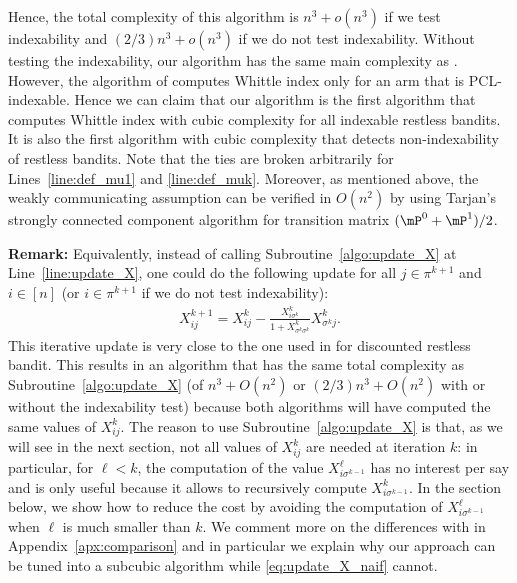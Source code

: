 Hence, the total complexity of this algorithm is $n^3+o(n^3)$ if we test indexability and $(2/3)n^3+o(n^3)$ if we do not test indexability. Without testing the indexability, our algorithm has the same main complexity as \cite{nino2020fast}. However, the algorithm of \cite{nino2020fast} computes Whittle index only for an arm that is PCL-indexable. Hence we can claim that our algorithm is the first algorithm that computes Whittle index with cubic complexity for all indexable restless bandits. It is also the first algorithm with cubic complexity that detects non-indexability of restless bandits.
Note that the ties are broken arbitrarily for Lines~\ref{line:def_mu1} and \ref{line:def_muk}. Moreover, as mentioned above, the weakly communicating assumption can be verified in $O(n^2)$ by using Tarjan's strongly connected component algorithm for transition matrix $(\mP^0+\mP^1)/2$.


\textbf{Remark:} Equivalently, instead of calling Subroutine~\ref{algo:update_X} at Line~\ref{line:update_X}, one could do the following update for all $j\in\pi^{k+1}$ and $i\in[n]$ (or $i\in\pi^{k+1}$ if we do not test indexability):
\begin{align}
    X_{ij}^{k+1} = X_{ij}^{k} -\displaystyle\frac{X^{k}_{i\sigma^{k}}}{1+X^{k}_{\sigma^{k}\sigma^{k}}}X^{k}_{\sigma^{k}j}. \label{eq:update_X_naif}
\end{align}
This iterative update is very close to the one used in \cite{akbarzadeh2020conditions,nino2020fast} for discounted restless bandit. This results in an algorithm that has the same total complexity as Subroutine~\ref{algo:update_X} (of $n^3+O(n^2)$ or $(2/3)n^3+O(n^2)$ with or without the indexability test) because both algorithms will have computed the same values of $X^{k}_{ij}$. The reason to use Subroutine~\ref{algo:update_X} is that, as we will see in the next section, not all values of $X^{k}_{ij}$ are needed at iteration $k$: in particular, for $\ell<k$, the computation of the value $X^\ell_{i\sigma^{k-1}}$ has no interest per say and is only useful because it allows to recursively compute $X^{k}_{i\sigma^{k-1}}$. In the section below, we show how to reduce the cost by avoiding the computation of $X^\ell_{i\sigma^{k-1}}$ when $\ell$ is much smaller than $k$. We comment more on the differences with \cite{akbarzadeh2020conditions,nino2020fast} in Appendix~\ref{apx:comparison} and in particular we explain why our approach can be tuned into a subcubic algorithm while \eqref{eq:update_X_naif} cannot.

